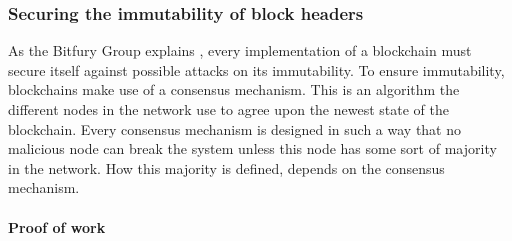 \subsubsection{Securing the immutability of block headers}

\iffalse
- need to secure against attacks on the immutability of its blockchain. otherwise, eg. considering a cryptocurrency system, an attacker could spend a coin and afterwards nullify this transaction by transmitting their own version of the blockchain without the spent transaction

- what are consensus mechansisms
\fi

As the Bitfury Group explains \cite{bitfury-pos-vs-pow}, every implementation of a blockchain must secure itself against possible attacks on its immutability. To ensure immutability, blockchains make use of a consensus mechanism. This is an algorithm the different nodes in the network use to agree upon the newest state of the blockchain. Every consensus mechanism is designed in such a way that no malicious node can break the system unless this node has some sort of majority in the network. How this majority is defined, depends on the consensus mechanism.

\iffalse
every consensus mechansism: 
- what is needed to suggest a new block
- how does this prevent 
- what are advantages and disadvantages
\fi

\paragraph{Proof of work}

\iffalse
- to suggest a new block, an entity needs to solve a random computational problem. This problem is designed as such that this entity, called the miner, has a chance of p%

- As the Bitfury Group correctly states \cite{bitfury-pos-vs-pow}: "[the] security of the network is supported by physically scarce resources: specialized hardware needed to run computations, and electricity spent to power the hardware." 
\fi

\iffalse
TODO: maybe add a small part about the alternative to a mining: merged mining and anchoring (cfr bitfury - group publc vs private prt 1)
\fi

